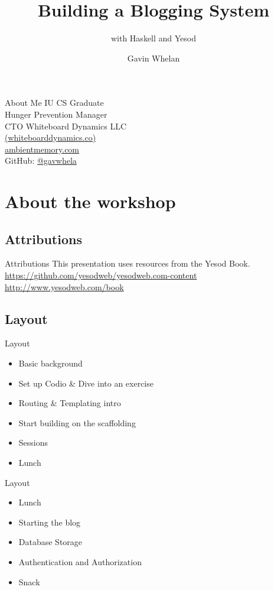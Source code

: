 \documentclass[pdf]{beamer}
\title{Building a Blogging System}
\subtitle{with Haskell and Yesod}
\author{Gavin Whelan}
\begin{document}
\begin{frame}
  \titlepage
\end{frame}

\begin{frame}{About Me}
  IU CS Graduate\\
  Hunger Prevention Manager\\
  CTO Whiteboard Dynamics LLC\\
  \href{https://whiteboarddynamics.co}{(whiteboarddynamics.co)}\\
  \href{https://ambientmemory.com}{ambientmemory.com}\\
  GitHub: \href{https://github.com/gavwhela}{@gavwhela}\\
\end{frame}

\section{About the workshop}
\subsection{Attributions}
\begin{frame}{Attributions}
  This presentation uses resources from the Yesod Book.\\
  \url{https://github.com/yesodweb/yesodweb.com-content}\\
  \url{http://www.yesodweb.com/book}\\
\end{frame}

\subsection{Layout}
\begin{frame}{Layout}
  \begin{itemize}
  \item<1-> Basic background
  \item<2-> Set up Codio \& Dive into an exercise
  \item<3-> Routing \& Templating intro
  \item<4-> Start building on the scaffolding
  \item<5-> Sessions
  \item<6> Lunch
  \end{itemize}
\end{frame}

\begin{frame}{Layout}
  \begin{itemize}
  \item<1-> Lunch
  \item<2-> Starting the blog
  \item<3-> Database Storage
  \item<4-> Authentication and Authorization
  \item<5-> Snack
  \end{itemize}
\end{frame}
\end{document}
